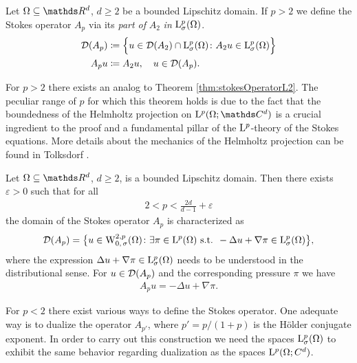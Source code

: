 \begin{defn}
  \label{defn:stokeslp}
  Let $\Omega\subseteq \R^d$, $d \geq 2$ be a bounded Lipschitz domain.
  If $p > 2$ we define the Stokes operator $A_p$ via its \emph{part of} $A_2$ \emph{in } $\mathrm{L}^p_\sigma(\Omega)$.
  \begin{align*}
    \mathcal{D}(A_p) &\coloneqq \Big\{ u \in \mathcal{D}(A_2) \cap \mathrm{L}^p_\sigma(\Omega) \colon A_2 u \in \mathrm{L}^p_\sigma(\Omega) \Big\} \\
    A_p u &\coloneqq A_2 u, \quad u \in \mathcal{D}(A_p).
  \end{align*}
\end{defn}

For $p > 2$ there exists an analog to Theorem \ref{thm:stokesOperatorL2}. The peculiar range of $p$ for which this theorem holds is due to the fact that the boundedness of the Helmholtz projection on $\Ell^p(\Omega; \C^d)$ is a crucial ingredient to the proof and a fundamental pillar of the $\mathrm{L}^p$-theory of the Stokes equations.
More details about the mechanics of the Helmholtz projection can be found in Tolksdorf \cite[Sec. 5.1]{tolksdorf}.

\begin{thm}
  \label{thm:domainStokesOperatorLp}
  Let $\Omega \subseteq \R^d$, $d \geq 2$, is a bounded Lipschitz domain.
  Then there exists $\varepsilon > 0$ such that for all
  \begin{align*}
    2 < p < \frac{2d}{d - 1} + \varepsilon
  \end{align*}
  the domain of the Stokes operator $A_p$ is characterized as
  \begin{align*}
    \mathcal{D}(A_p) = \big\{ u \in \mathrm{W}^{2,p}_{0,\,\sigma}(\Omega) \colon \exists \pi \in \mathrm{L}^p(\Omega) \text{ s.t. } -\Delta u + \nabla \pi \in \mathrm{L}^p_\sigma(\Omega) \big\},
  \end{align*}
  where the expression $\Delta u + \nabla \pi \in\mathrm{L}^p_\sigma(\Omega)$ needs to be understood in the distributional sense.
  For $u \in \mathcal{D}(A_p)$ and the corresponding pressure $\pi$ we have
  \begin{align*}
    A_p u = -\Delta u + \nabla \pi.
  \end{align*}
\end{thm}

For $p < 2$ there exist various ways to define the Stokes operator.
One adequate way is to dualize the operator $A_{p'}$, where $p' = p / (1 + p)$ is the Hölder conjugate exponent.
In order to carry out this construction we need the spaces $\mathrm{L}^p_\sigma(\Omega)$ to exhibit the same behavior regarding dualization as the spaces $\mathrm{L}^p(\Omega; C^d)$.

